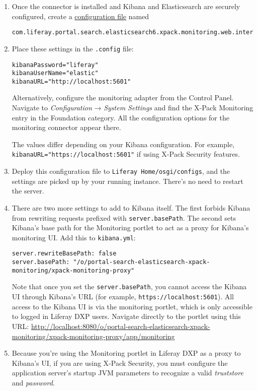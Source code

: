 \begin{enumerate}
\def\labelenumi{\arabic{enumi}.}
\item
  Once the connector is installed and Kibana and Elasticsearch are
  securely configured, create a
  \href{/docs/7-0/user/-/knowledge_base/u/understanding-system-configuration-files}{configuration
  file} named

\begin{verbatim}
com.liferay.portal.search.elasticsearch6.xpack.monitoring.web.internal.configuration.XPackMonitoringConfiguration.config
\end{verbatim}
\item
  Place these settings in the \texttt{.config} file:

\begin{verbatim}
kibanaPassword="liferay"
kibanaUserName="elastic"
kibanaURL="http://localhost:5601"
\end{verbatim}

  Alternatively, configure the monitoring adapter from the Control
  Panel. Navigate to \emph{Configuration} → \emph{System Settings} and
  find the X-Pack Monitoring entry in the Foundation category. All the
  configuration options for the monitoring connector appear there.

  The values differ depending on your Kibana configuration. For example,
  \texttt{kibanaURL="https://localhost:5601"} if using X-Pack Security
  features.
\item
  Deploy this configuration file to \texttt{Liferay\ Home/osgi/configs},
  and the settings are picked up by your running instance. There's no
  need to restart the server.
\item
  There are two more settings to add to Kibana itself. The first forbids
  Kibana from rewriting requests prefixed with \texttt{server.basePath}.
  The second sets Kibana's base path for the Monitoring portlet to act
  as a proxy for Kibana's monitoring UI. Add this to
  \texttt{kibana.yml}:

\begin{verbatim}
server.rewriteBasePath: false
server.basePath: "/o/portal-search-elasticsearch-xpack-monitoring/xpack-monitoring-proxy"
\end{verbatim}

  Note that once you set the \texttt{server.basePath}, you cannot access
  the Kibana UI through Kibana's URL (for example,
  \texttt{https://localhost:5601}). All access to the Kibana UI is via
  the monitoring portlet, which is only accessible to logged in Liferay
  DXP users. Navigate directly to the portlet using this URL:
  \url{http://localhost:8080/o/portal-search-elasticsearch-xpack-monitoring/xpack-monitoring-proxy/app/monitoring}
\item
  Because you're using the Monitoring portlet in Liferay DXP as a proxy
  to Kibana's UI, if you are using X-Pack Security, you must configure
  the application server's startup JVM parameters to recognize a valid
  \emph{truststore} and \emph{password}.


\end{enumerate}
